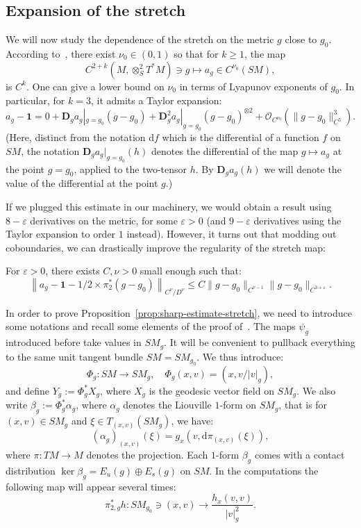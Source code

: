 \documentclass[10pt]{amsart}
\theoremstyle{definition}\newtheorem{defi}[theo]{Definition}\newtheorem{rema}[theo]{Remark}\newtheorem{exam}[theo]{Example}\newtheorem{exem}[theo]{Example}\newtheorem{nota}[theo]{Notation}
\newcommand{\bdD}{\mathbf{D}}
\newcommand{\bfun}{\mathbf{1}}
\newcommand{\eps}{\varepsilon}
\newcommand{\mc}{\mathcal}
\newcommand{\dd}{\mathrm{d}}
\begin{document}
\subsection{Expansion of the stretch}

We will now study the dependence of the stretch on the metric $g$ close to $g_0$. According to~\cite[Proposition~2.2]{Katok-Knieper-Pollicott-Weiss-89}, there exist $\nu_0\in (0,1)$ so that for $k\geq 1$, the map
\[
C^{2+k}\left(M,\otimes^2_S T^*M\right) \ni g \mapsto a_g \in C^{\nu_0}(SM),
\]
is $C^k$. One can give a lower bound on $\nu_0$ in terms of Lyapunov exponents of $g_0$. In particular, for $k=3$, it admits a Taylor expansion:
\begin{equation}\label{equation:taylor}
a_g - \bfun = 0 + \bdD_{g}a_g|_{g=g_0}(g-g_0) + \bdD^2_{g}a_g|_{g=g_0} (g-g_0)^{\otimes 2} + \mc{O}_{C^{\nu_0}}\left(\|g-g_0\|_{C^5}^3\right).
\end{equation}
(Here, distinct from the notation $\dd f$ which is the differential of a function $f$ on $SM$, the notation $\bdD_g a_{g} |_{g=g_0}(h)$ denotes the differential of the map $g \mapsto a_g$ at the point $g=g_0$, applied to the two-tensor $h$. By $\bdD_g a_{g} (h)$ we will denote the value of the differential at the point $g$.)

If we plugged this estimate in our machinery, we would obtain a result using $8-\eps$ derivatives on the metric, for some $\eps>0$ (and $9-\eps$ derivatives using the Taylor expansion to order $1$ instead). However, it turns out that modding out coboundaries, we can drastically improve the regularity of the stretch map:

\begin{prop}\label{prop:sharp-estimate-stretch}
For $\eps>0$, there exists $C,\nu>0$ small enough such that:
\begin{equation}
\left\|a_g - \bfun -1/2 \times \pi_2^\ast(g-g_0)\right\|_{C^\nu/D^\nu} \leq C \|g-g_0\|_{C^{\nu-1}} \|g-g_0\|_{C^{3+\eps}}.
\end{equation}
\end{prop}

In order to prove Proposition~\ref{prop:sharp-estimate-stretch}, we need to introduce some notations and recall some elements of the proof of~\cite[Proposition~2.2]{Katok-Knieper-Pollicott-Weiss-89}. The maps $\psi_g$ introduced before take values in $SM_g$. It will be convenient to pullback everything to the same unit tangent bundle $SM = SM_{g_0}$. We thus introduce:
\[
\Phi_g : SM \to SM_g,\quad\Phi_{g}(x,v) = (x,v/|v|_g),
\]
and define $Y_g := \Phi_g^* X_g$, where $X_g$ is the geodesic vector field on $SM_{g}$. We also write $\beta_g := \Phi_g^* \alpha_g$, where $\alpha_g$ denotes the Liouville $1$-form on $SM_g$, that is for $(x,v) \in SM_g$ and $\xi \in T_{(x,v)}(SM_g)$, we have:
\begin{equation}\label{equation:bam}
(\alpha_g)_{(x,v)}(\xi) = g_x\left(v, \dd\pi_{(x,v)}(\xi)\right),
\end{equation}
where $\pi : TM \to M$ denotes the projection. Each $1$-form $\beta_g$ comes with a contact distribution $\ker \beta_g = E_u(g) \oplus E_s(g)$ on $SM$. In the computations the following map will appear several times:
\[
\pi_{2,g}^\ast h : SM_{g_0} \owns (x,v) \to \frac{h_x(v,v)}{|v|_g^2}.
\]
\end{document}
